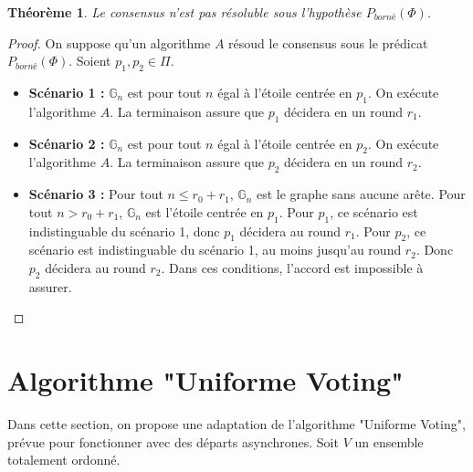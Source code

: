 \documentclass{article}
\newtheorem{theorem}{Théorème}
\begin{document}
\begin{theorem}
	Le consensus n'est pas résoluble sous l'hypothèse $P_{borné}(\Phi)$.
\end{theorem}
\begin{proof}
	On suppose qu'un algorithme $A$ résoud le consensus sous le prédicat $P_{borné}(\Phi)$. Soient $p_1, p_2 \in \Pi$.
	\begin{itemize}

		\item \textbf{Scénario 1 :} $\mathds{G}_n$ est pour tout $n$ égal à l'étoile centrée en $p_1$. On exécute l'algorithme $A$. La terminaison assure que $p_1$ décidera en un round $r_1$.
		\item \textbf{Scénario 2 :} $\mathds{G}_n$ est pour tout $n$ égal à l'étoile centrée en $p_2$. On exécute l'algorithme $A$. La terminaison assure que $p_2$ décidera en un round $r_2$.
		\item \textbf{Scénario 3 :} Pour tout $n \leq r_0 + r_1$, $\mathds{G}_n$ est le graphe sans aucune arête. Pour tout $n > r_0 + r_1$, $\mathds{G}_n$ est l'étoile centrée en $p_1$.
			Pour $p_1$, ce scénario est indistinguable du scénario 1, donc $p_1$ décidera au round $r_1$.
			Pour $p_2$, ce scénario est indistinguable du scénario 1, au moins jusqu'au round $r_2$. Donc $p_2$ décidera au round $r_2$.
			Dans ces conditions, l'accord est impossible à assurer.

	\end{itemize}
\end{proof}


\section{Algorithme "Uniforme Voting"}

Dans cette section, on propose une adaptation de l'algorithme  "Uniforme Voting", prévue pour fonctionner avec des départs asynchrones.
Soit $V$ un ensemble totalement ordonné.
\end{document}
